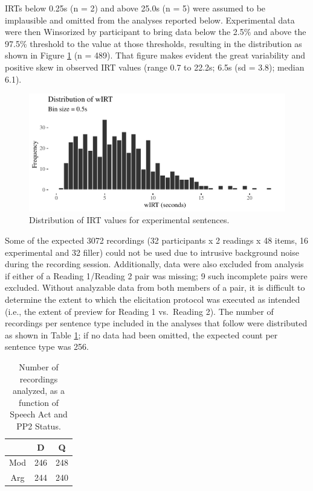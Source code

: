 \documentclass[11pt,oneside]{book}
\begin{document}
IRTs below 0.25s (n = 2) and above 25.0s (n = 5) were assumed to be implausible and omitted from the analyses reported below. Experimental data were then Winsorized by participant to bring data below the 2.5\% and above the 97.5\% threshold to the value at those thresholds, resulting in the distribution as shown in Figure \ref{fig:wIRT} (n = 489). That figure makes evident the great variability and positive skew in observed IRT values (range 0.7 to 22.2s; 6.5s (sd = 3.8); median 6.1).

\begin{figure}
\centering
\includegraphics{4-results_files/figure-latex/wIRT-1.pdf}
\caption{\label{fig:wIRT}Distribution of IRT values for experimental sentences.}
\end{figure}

Some of the expected 3072 recordings (32 participants x 2 readings x 48 items, 16 experimental and 32 filler) could not be used due to intrusive background noise during the recording session. Additionally, data were also excluded from analysis if either of a Reading 1/Reading 2 pair was missing; 9 such incomplete pairs were excluded. Without analyzable data from both members of a pair, it is difficult to determine the extent to which the elicitation protocol was executed as intended (i.e., the extent of preview for Reading 1 vs.~Reading 2). The number of recordings per sentence type included in the analyses that follow were distributed as shown in Table \ref{tab:rvtab}; if no data had been omitted, the expected count per sentence type was 256.

\begin{table}[!h]

\caption{\label{tab:rvtab}Number of recordings analyzed, as a function of Speech Act and PP2 Status.}
\centering
\begin{tabular}{ccc}
\toprule
  & D & Q\\
\midrule
Mod & 246 & 248\\
Arg & 244 & 240\\
\bottomrule
\end{tabular}
\end{table}
\end{document}
